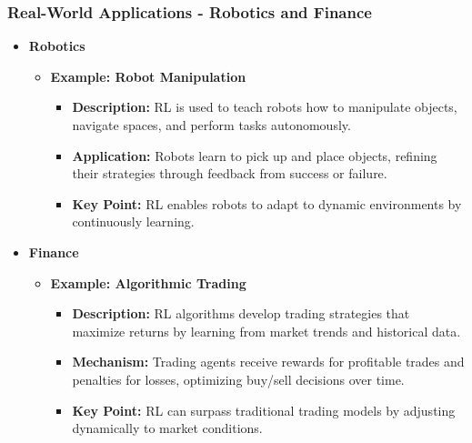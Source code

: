 \documentclass{beamer}
\begin{document}
\begin{frame}[fragile]
    \frametitle{Real-World Applications - Robotics and Finance}
    \begin{itemize}
        \item \textbf{Robotics}
        \begin{itemize}
            \item \textbf{Example: Robot Manipulation}
            \begin{itemize}
                \item \textbf{Description:} RL is used to teach robots how to manipulate objects, navigate spaces, and perform tasks autonomously.
                \item \textbf{Application:} Robots learn to pick up and place objects, refining their strategies through feedback from success or failure.
                \item \textbf{Key Point:} RL enables robots to adapt to dynamic environments by continuously learning.
            \end{itemize}
        \end{itemize}
        
        \item \textbf{Finance}
        \begin{itemize}
            \item \textbf{Example: Algorithmic Trading}
            \begin{itemize}
                \item \textbf{Description:} RL algorithms develop trading strategies that maximize returns by learning from market trends and historical data.
                \item \textbf{Mechanism:} Trading agents receive rewards for profitable trades and penalties for losses, optimizing buy/sell decisions over time.
                \item \textbf{Key Point:} RL can surpass traditional trading models by adjusting dynamically to market conditions.
            \end{itemize}
        \end{itemize}
    \end{itemize}
\end{frame}
\end{document}
